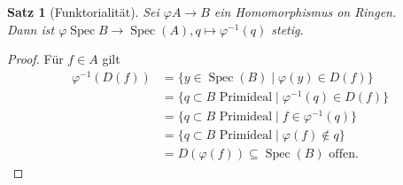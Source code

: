 \documentclass[10pt,a4paper]{article}
\newcommand{\Spec}{\ensuremath{\operatorname{Spec}}}
\newcounter{thm}[section]
\theoremstyle{definition}
\theoremstyle{plain}
\newtheorem{satz}[thm]{Satz}
\theoremstyle{remark}
\begin{document}
\begin{satz}[Funktorialität]
	\label{satz420}
	Sei $\varphi
	A\rightarrow  B$ ein Homomorphismus on Ringen.\\
	Dann ist $\varphi\Spec B\to\Spec(A),q\mapsto \varphi^{-1}(q)$ stetig.
\end{satz}
\begin{proof}
	Für $f\in A$ gilt
	\begin{align*}
	\varphi^{-1}(D(f))&=\{y\in\Spec(B)\mid\varphi(y)\in D(f)\}\\
	&=\{q\subset B\text{ Primideal}\mid\varphi^{-1}(q)\in D(f)\}\\
	&=\{q\subset B\text{ Primideal}\mid f\in \varphi^{-1}(q)\}\\
	&=\{q\subset B\text{ Primideal}\mid\varphi(f)\notin q\}\\
	&=D(\varphi(f))\subseteq\Spec(B)\text{ offen.}
	\end{align*}
\end{proof}
\end{document}
